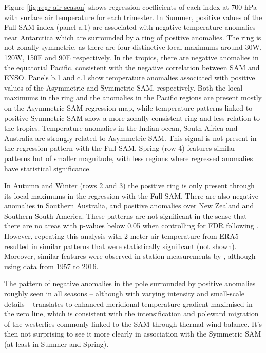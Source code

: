 \documentclass[smallextended]{svjour3}       %
\begin{document}
Figure \ref{fig:regr-air-season} shows regression coefficients of each index at 700 hPa with surface air temperature for each trimester. In Summer, positive values of the Full SAM index (panel a.1) are associated with negative temperature anomalies near Antarctica which are surrounded by a ring of positive anomalies. The ring is not zonally symmetric, as there are four distinctive local maximums around 30\degree W, 120\degree W, 150\degree E and 90\degree E respectively. In the tropics, there are negative anomalies in the equatorial Pacific, consistent with the negative correlation between SAM and ENSO. Panels b.1 and c.1 show temperature anomalies associated with positive values of the Asymmetric and Symmetric SAM, respectively. Both the local maximums in the ring and the anomalies in the Pacific regions are present mostly on the Asymmetric SAM regression map, while temperature patterns linked to positive Symmetric SAM show a more zonally consistent ring and less relation to the tropics. Temperature anomalies in the Indian ocean, South Africa and Australia are strongly related to Asymmetric SAM. This signal is not present in the regression pattern with the Full SAM. Spring (row 4) features similar patterns but of smaller magnitude, with less regions where regressed anomalies have statistical significance.

In Autumn and Winter (rows 2 and 3) the positive ring is only present through its local maximums in the regression with the Full SAM. There are also negative anomalies in Southern Australia, and positive anomalies over New Zealand and Southern South America. These patterns are not significant in the sense that there are no areas with p-values below 0.05 when controlling for FDR following \citet{wilks2016}. However, repeating this analysis with 2-meter air temperature from ERA5 resulted in similar patterns that were statistically significant (not shown). Moreover, similar features were observed in station measurements by \citet{jones2019}, although using data from 1957 to 2016.

The pattern of negative anomalies in the pole surrounded by positive anomalies roughly seen in all seasons -- although with varying intensity and small-scale details -- translates to enhanced meridional temperature gradient maximised in the zero line, which is consistent with the intensification and poleward migration of the westerlies commonly linked to the SAM through thermal wind balance. It's then not surprising to see it more clearly in association with the Symmetric SAM (at least in Summer and Spring).
\end{document}
